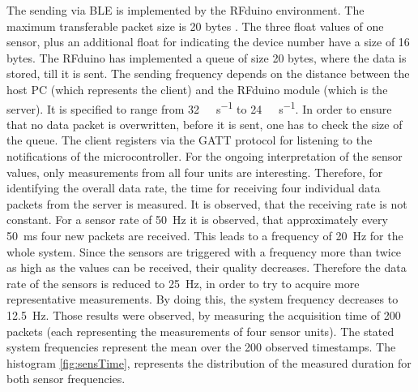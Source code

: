 The sending via BLE is implemented by the RFduino environment. The maximum transferable packet size is 20 bytes \cite{rfduino2015data}. The three float values of one sensor, plus an additional float for indicating the device number have a size of 16 bytes. The RFduino has implemented a queue of size 20 bytes, where the data is stored, till it is sent. The sending frequency depends on the distance between the host PC (which represents the client) and the RFduino module (which is the server). It is specified to range from \SI[per-mode=symbol]{32}{\kilo \bit \per \second} to \SI[per-mode=symbol]{24}{\kilo \bit \per \second}. In order to ensure that no data packet is overwritten, before it is sent, one has to check the size of the queue. The client registers via the \ac{GATT} protocol for listening to the notifications of the microcontroller. For the ongoing interpretation of the sensor values, only measurements from all four units are interesting. Therefore, for identifying the overall data rate, the time for receiving four individual data packets from the server is measured. It is observed, that the receiving rate is not constant. For a sensor rate of \SI{50}{\Hz} it is observed, that approximately every \SI{50}{\ms} four new packets are received. This leads to a frequency of \SI{20}{\Hz} for the whole system. Since the sensors are triggered with a frequency more than twice as high as the values can be received, their quality decreases. Therefore the data rate of the sensors is reduced to \SI{25}{\Hz}, in order to try to acquire more representative measurements. By doing this, the system frequency decreases to \SI{12.5}{\Hz}. Those results were observed, by measuring the acquisition time of 200 packets (each representing the measurements of four sensor units). The stated system frequencies represent the mean over the 200 observed timestamps. The histogram \ref{fig:sensTime}, represents the distribution of the measured duration for both sensor frequencies.


